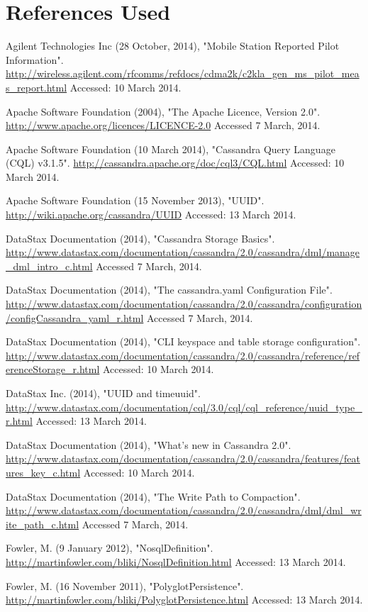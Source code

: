 \documentclass[letterpaper]{article}
\begin{document}
\section{References Used}

Agilent Technologies Inc (28 October, 2014), "Mobile Station Reported Pilot Information".
\url{http://wireless.agilent.com/rfcomms/refdocs/cdma2k/c2kla_gen_ms_pilot_meas_report.html}
Accessed: 10 March 2014.

Apache Software Foundation (2004), "The Apache Licence, Version 2.0".
\url{http://www.apache.org/licences/LICENCE-2.0}
Accessed 7 March, 2014.

Apache Software Foundation (10 March 2014), "Cassandra Query Language (CQL) v3.1.5".
\url{http://cassandra.apache.org/doc/cql3/CQL.html}
Accessed: 10 March 2014.


Apache Software Foundation (15 November 2013), "UUID".
\url{http://wiki.apache.org/cassandra/UUID}
Accessed: 13 March 2014.


DataStax Documentation (2014), "Cassandra Storage Basics".
\url{http://www.datastax.com/documentation/cassandra/2.0/cassandra/dml/manage_dml_intro_c.html}
Accessed 7 March, 2014.

DataStax Documentation (2014), "The cassandra.yaml Configuration File".
\url{http://www.datastax.com/documentation/cassandra/2.0/cassandra/configuration/configCassandra_yaml_r.html}
Accessed 7 March, 2014.  

DataStax Documentation (2014), "CLI keyspace and table storage configuration".
\url{http://www.datastax.com/documentation/cassandra/2.0/cassandra/reference/referenceStorage_r.html}
Accessed: 10 March 2014.

DataStax Inc. (2014), "UUID and timeuuid".
\url{http://www.datastax.com/documentation/cql/3.0/cql/cql_reference/uuid_type_r.html}
Accessed: 13 March 2014.

DataStax Documentation (2014), "What's new in Cassandra 2.0".
\url{http://www.datastax.com/documentation/cassandra/2.0/cassandra/features/features_key_c.html}
Accessed: 10 March 2014.

DataStax Documentation (2014), "The Write Path to Compaction".
\url{http://www.datastax.com/documentation/cassandra/2.0/cassandra/dml/dml_write_path_c.html}
Accessed 7 March, 2014.


Fowler, M. (9 January 2012), "NosqlDefinition".
\url{http://martinfowler.com/bliki/NosqlDefinition.html}
Accessed: 13 March 2014.

Fowler, M. (16 November 2011), "PolyglotPersistence".
\url{http://martinfowler.com/bliki/PolyglotPersistence.html}
Accessed: 13 March 2014.
\end{document}
